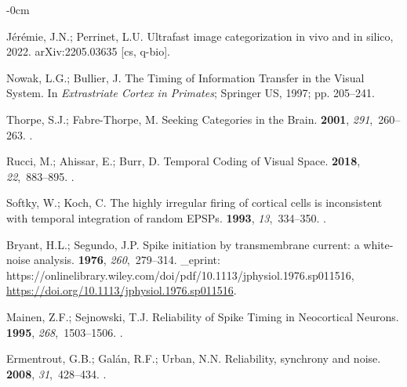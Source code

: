 \documentclass[brainsci, %
               review,submit,pdftex,moreauthors
               ]{Definitions/mdpi}
\begin{document}
\begin{adjustwidth}{-\extralength}{0cm}
\begin{thebibliography}{999}
  Jérémie, J.N.; Perrinet, L.U.
  \newblock Ultrafast image categorization in vivo and in silico,  2022.
  \newblock arXiv:2205.03635 [cs, q-bio].
  
  Nowak, L.G.; Bullier, J.
  \newblock The {Timing} of {Information} {Transfer} in the {Visual} {System}. In
    {\em Extrastriate {Cortex} in {Primates}}; Springer US,  1997; pp. 205--241.
  
  Thorpe, S.J.; Fabre-Thorpe, M.
  \newblock Seeking {Categories} in the {Brain}.
   {\bf 2001}, {\em 291},~260--263.
  .
  
  Rucci, M.; Ahissar, E.; Burr, D.
  \newblock Temporal {Coding} of {Visual} {Space}.
   {\bf 2018}, {\em 22},~883--895.
  .
  
  Softky, W.; Koch, C.
  \newblock The highly irregular firing of cortical cells is inconsistent with
    temporal integration of random {EPSPs}.
   {\bf 1993}, {\em 13},~334--350.
  .
  
  Bryant, H.L.; Segundo, J.P.
  \newblock Spike initiation by transmembrane current: a white-noise analysis.
   {\bf 1976}, {\em 260},~279--314.
  \newblock \_eprint:
    https://onlinelibrary.wiley.com/doi/pdf/10.1113/jphysiol.1976.sp011516,
    {\url{https://doi.org/10.1113/jphysiol.1976.sp011516}}.
  
  Mainen, Z.F.; Sejnowski, T.J.
  \newblock Reliability of {Spike} {Timing} in {Neocortical} {Neurons}.
   {\bf 1995}, {\em 268},~1503--1506.
  .
  
  Ermentrout, G.B.; Galán, R.F.; Urban, N.N.
  \newblock Reliability, synchrony and noise.
   {\bf 2008}, {\em 31},~428--434.
  .
  

\end{thebibliography}
\end{adjustwidth}
\end{document}
